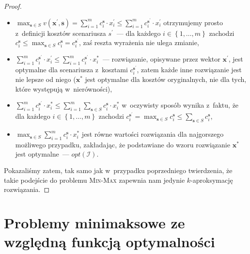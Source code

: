 \begin{proof}
	\begin{itemize}
		\item $\max_{\textbf{s} \in S} v \left( \textbf{x}^{\prime}, \textbf{s} \right) = \sum_{i = 1}^{m} c_{i}^{\textbf{s}} \cdot x_{i}^{\prime} \leqslant \sum_{i = 1}^{m} c_{i}^{\textbf{s}^{\prime}} \cdot x_{i}^{\prime}$ otrzymujemy prosto z~definicji kosztów scenariusza $s^{\prime}$~--- dla każdego $i \in \left\{ 1, \dots, m \right\}$ zachodzi $c_{i}^{\textbf{s}} \leqslant \max_{\textbf{s} \in S} c^{\textbf{s}}_{i} = c_{i}^{\textbf{s}^{\prime}}$, zaś reszta wyrażenia nie ulega zmianie,
		\item $\sum_{i = 1}^{m} c_{i}^{\textbf{s}^{\prime}} \cdot x_{i}^{\prime} \leqslant \sum_{i = 1}^{m} c_{i}^{\textbf{s}^{\prime}} \cdot x_{i}^{\ast}$~--- rozwiązanie, opisywane przez wektor $\textbf{x}^{\prime}$, jest optymalne dla scenariusza z~kosztami $c_{i}^{\textbf{s}^{\prime}}$, zatem każde inne rozwiązanie jest nie lepsze od niego ($\textbf{x}^{\ast}$ jest optymalne dla kosztów oryginalnych, nie dla tych, które występują w~nierówności),
		\item $\sum_{i = 1}^{m} c_{i}^{\textbf{s}^{\prime}} \cdot x_{i}^{\ast} \leqslant \sum_{i = 1}^{m} \sum_{\textbf{s} \in S} c_{i}^{\textbf{s}} \cdot x_{i}^{\ast}$ w~oczywisty sposób wynika z~faktu, że dla każdego $i \in \left\{ 1, \dots, m \right\}$ zachodzi $c_{i}^{\textbf{s}^{\prime}} = \max_{\textbf{s} \in S} c^{\textbf{s}}_{i} \leqslant \sum_{\textbf{s} \in S} c^{\textbf{s}}_{i}$,
		\item $\max_{\textbf{s} \in S} \sum_{i = 1}^{m} c_{i}^{\textbf{s}} \cdot x_{i}^{\ast}$ jest równe wartości rozwiązania dla najgorszego możliwego przypadku, zakładając, że podstawiane do wzoru rozwiązanie $\textbf{x}^{\ast}$ jest optymalne~--- $ opt \left( \mathcal{I} \right)$.
	\end{itemize}
	
	Pokazaliśmy zatem, tak samo jak w~przypadku poprzedniego twierdzenia, że takie podejście do problemu \textsc{Min-Max} zapewnia nam jedynie $k$-aproksymację rozwiązania.
\end{proof}




\section{Problemy minimaksowe ze względną funkcją optymalności}




